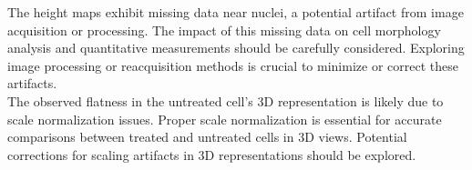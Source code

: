\documentclass[a4paper,english,12pt,bibliography=totoc]{scrreprt}
\begin{document}
The height maps exhibit missing data near nuclei, a potential artifact from image acquisition or processing. The impact of this missing data on cell morphology analysis and quantitative measurements should be carefully considered. Exploring image processing or reacquisition methods is crucial to minimize or correct these artifacts.\\

The observed flatness in the untreated cell's 3D representation is likely due to scale normalization issues. Proper scale normalization is essential for accurate comparisons between treated and untreated cells in 3D views. Potential corrections for scaling artifacts in 3D representations should be explored.
\end{document}
